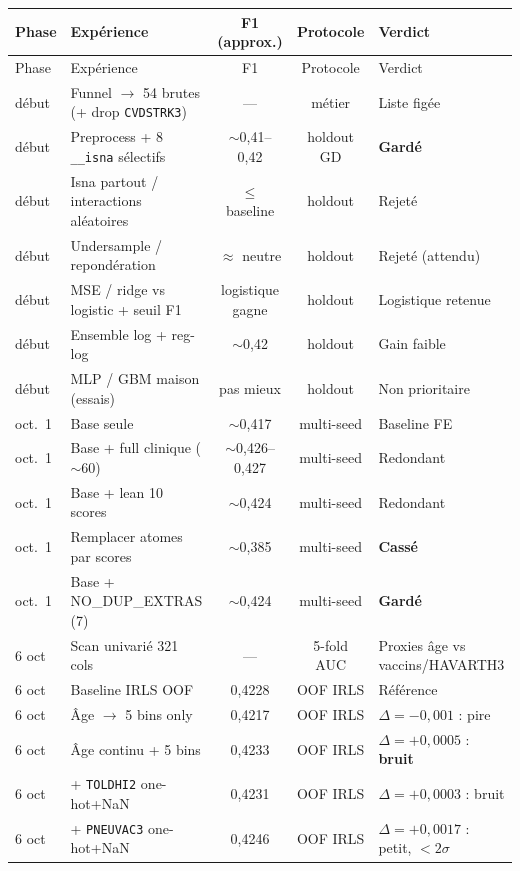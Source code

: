 \documentclass[11pt,a4paper]{article}
\begin{document}
\begin{longtable}{@{}p{2.4cm}p{5.0cm}ccp{3.8cm}@{}}
\toprule
Phase & Expérience & F1 (approx.) & Protocole & Verdict \\
\midrule
\endfirsthead
\toprule
Phase & Expérience & F1 & Protocole & Verdict \\
\midrule
\endhead

début & Funnel $\to$ 54 brutes (+ drop \texttt{CVDSTRK3}) & --- & métier & Liste figée \\
début & Preprocess + 8 \texttt{\_\_isna} sélectifs & $\sim$0{,}41--0{,}42 & holdout GD & \textbf{Gardé} \\
début & Isna partout / interactions aléatoires & $\leq$ baseline & holdout & Rejeté \\
début & Undersample / repondération & $\approx$ neutre & holdout & Rejeté (attendu) \\
début & MSE / ridge vs logistic + seuil F1 & logistique gagne & holdout & Logistique retenue \\
début & Ensemble log + reg-log & $\sim$0{,}42 & holdout & Gain faible \\
début & MLP / GBM maison (essais) & pas mieux & holdout & Non prioritaire \\
oct.\ 1 & Base seule & $\sim$0{,}417 & multi-seed & Baseline FE \\
oct.\ 1 & Base + full clinique ($\sim$60) & $\sim$0{,}426--0{,}427 & multi-seed & Redondant \\
oct.\ 1 & Base + lean 10 scores & $\sim$0{,}424 & multi-seed & Redondant \\
oct.\ 1 & Remplacer atomes par scores & $\sim$0{,}385 & multi-seed & \textbf{Cassé} \\
oct.\ 1 & Base + NO\_DUP\_EXTRAS (7) & $\sim$0{,}424 & multi-seed & \textbf{Gardé} \\
6 oct & Scan univarié 321 cols & --- & 5-fold AUC & Proxies âge vs vaccins/HAVARTH3 \\
6 oct & Baseline IRLS OOF & 0{,}4228 & OOF IRLS & Référence \\
6 oct & Âge $\to$ 5 bins only & 0{,}4217 & OOF IRLS & $\Delta=-0{,}001$ : pire \\
6 oct & Âge continu + 5 bins & 0{,}4233 & OOF IRLS & $\Delta=+0{,}0005$ : \textbf{bruit} \\
6 oct & + \texttt{TOLDHI2} one-hot+NaN & 0{,}4231 & OOF IRLS & $\Delta=+0{,}0003$ : bruit \\
6 oct & + \texttt{PNEUVAC3} one-hot+NaN & 0{,}4246 & OOF IRLS & $\Delta=+0{,}0017$ : petit, $<2\sigma$ \\

\end{longtable}
\end{document}
